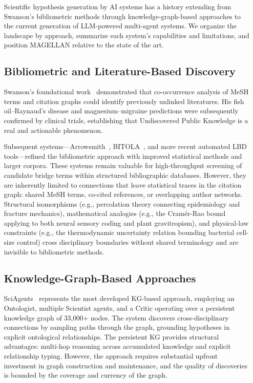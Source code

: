 Scientific hypothesis generation by AI systems has a history extending from Swanson's bibliometric methods through knowledge-graph-based approaches to the current generation of LLM-powered multi-agent systems. We organize the landscape by approach, summarize each system's capabilities and limitations, and position MAGELLAN relative to the state of the art.

\subsection{Bibliometric and Literature-Based Discovery}

Swanson's foundational work~\citep{swanson1986,swanson1988} demonstrated that co-occurrence analysis of MeSH terms and citation graphs could identify previously unlinked literatures. His fish oil--Ray\-naud's disease and magnesium--migraine predictions were subsequently confirmed by clinical trials, establishing that Undiscovered Public Knowledge is a real and actionable phenomenon.

Subsequent systems---Arrowsmith~\citep{smalheiser2009}, BITOLA~\citep{hristovski2006}, and more recent automated LBD tools---refined the bibliometric approach with improved statistical methods and larger corpora. These systems remain valuable for high-throughput screening of candidate bridge terms within structured bibliographic databases. However, they are inherently limited to connections that leave statistical traces in the citation graph: shared MeSH terms, co-cited references, or overlapping author networks. Structural isomorphisms (e.g., percolation theory connecting epidemiology and fracture mechanics), mathematical analogies (e.g., the Cram\'{e}r-Rao bound applying to both neural sensory coding and plant gravitropism), and physical-law constraints (e.g., the thermodynamic uncertainty relation bounding bacterial cell-size control) cross disciplinary boundaries without shared terminology and are invisible to bibliometric methods.

\subsection{Knowledge-Graph-Based Approaches}

SciAgents~\citep{ghafarollahi2024} represents the most developed KG-based approach, employing an Ontologist, multiple Scientist agents, and a Critic operating over a persistent knowledge graph of 33,000+ nodes. The system discovers cross-disciplinary connections by sampling paths through the graph, grounding hypotheses in explicit ontological relationships. The persistent KG provides structural advantages: multi-hop reasoning across accumulated knowledge and explicit relationship typing. However, the approach requires substantial upfront investment in graph construction and maintenance, and the quality of discoveries is bounded by the coverage and currency of the graph.

